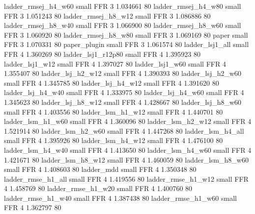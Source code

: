      ladder_rmsej_h4_w60      small      FFR                 3 1.034661 80
     ladder_rmsej_h4_w80      small      FFR                 3 1.051243 80
     ladder_rmsej_h8_w12      small      FFR                 3 1.086886 80
     ladder_rmsej_h8_w40      small      FFR                 3 1.066900 80
     ladder_rmsej_h8_w60      small      FFR                 3 1.060920 80
     ladder_rmsej_h8_w80      small      FFR                 3 1.069169 80
                   paper      small      FFR                 3 1.070331 80
            paper_plugin      small      FFR                 3 1.061574 80
         ladder_lsj1_all      small      FFR                 4 1.360269 80
      ladder_lsj1_r12p80      small      FFR                 4 1.395923 80
         ladder_lsj1_w12      small      FFR                 4 1.397027 80
         ladder_lsj1_w60      small      FFR                 4 1.355407 80
       ladder_lsj_h2_w12      small      FFR                 4 1.390393 80
       ladder_lsj_h2_w60      small      FFR                 4 1.345785 80
       ladder_lsj_h4_w12      small      FFR                 4 1.391620 80
       ladder_lsj_h4_w40      small      FFR                 4 1.333975 80
       ladder_lsj_h4_w60      small      FFR                 4 1.345623 80
       ladder_lsj_h8_w12      small      FFR                 4 1.428667 80
       ladder_lsj_h8_w60      small      FFR                 4 1.403556 80
       ladder_lsm_h1_w12      small      FFR                 4 1.440701 80
       ladder_lsm_h1_w60      small      FFR                 4 1.360096 80
       ladder_lsm_h2_w12      small      FFR                 4 1.521914 80
       ladder_lsm_h2_w60      small      FFR                 4 1.447268 80
       ladder_lsm_h4_all      small      FFR                 4 1.395926 80
       ladder_lsm_h4_w12      small      FFR                 4 1.476100 80
       ladder_lsm_h4_w40      small      FFR                 4 1.413650 80
       ladder_lsm_h4_w60      small      FFR                 4 1.421671 80
       ladder_lsm_h8_w12      small      FFR                 4 1.460059 80
       ladder_lsm_h8_w60      small      FFR                 4 1.408603 80
              ladder_mdd      small      FFR                 4 1.350348 80
      ladder_rmse_h1_all      small      FFR                 4 1.419556 80
      ladder_rmse_h1_w12      small      FFR                 4 1.458769 80
      ladder_rmse_h1_w20      small      FFR                 4 1.400760 80
      ladder_rmse_h1_w40      small      FFR                 4 1.387438 80
      ladder_rmse_h1_w60      small      FFR                 4 1.362797 80
